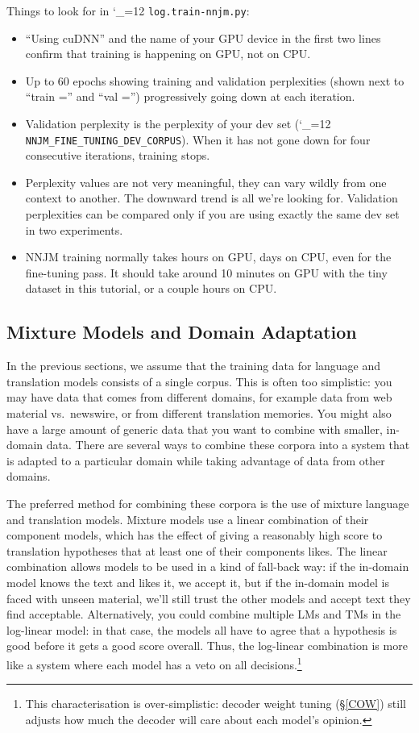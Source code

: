 \documentclass[11pt,letterpaper]{article}
\def\code{\begingroup\catcode`\_=12 \codex}
\newcommand{\codex}[1]{\texttt{#1}\endgroup}
\begin{document}
Things to look for in \code{log.train-nnjm.py}:
\begin{itemize}
   \item ``Using cuDNN'' and the name of your GPU device in the first two lines
      confirm that training is happening on GPU, not on CPU.
   \item Up to 60 epochs showing training and validation perplexities (shown
      next to ``train ='' and ``val ='') progressively going down at each
      iteration.
   \item Validation perplexity is the perplexity of your dev set
      (\code{NNJM_FINE_TUNING_DEV_CORPUS}). When it has not gone down for four
      consecutive iterations, training stops.
   \item Perplexity values are not very meaningful, they can vary wildly from
      one context to another. The downward trend is all we're looking for.
      Validation perplexities can be compared only if you are using exactly the
      same dev set in two experiments.
   \item NNJM training normally takes hours on GPU, days on CPU, even for the
      fine-tuning pass. It should take around 10 minutes on GPU with the tiny
      dataset in this tutorial, or a couple hours on CPU.
\end{itemize}

\subsection{Mixture Models and Domain Adaptation} \label{MIX}

In the previous sections, we assume that the training data for
language and translation models consists of a single corpus.  This is often too
simplistic: you may have data that comes from different domains, for example
data from web material vs.\ newswire, or from different translation memories.
You might also have a large amount of generic data that you want to combine
with smaller, in-domain data.  There are several ways to combine these corpora
into a system that is adapted to a particular domain while taking advantage of
data from other domains.

The preferred method for combining these corpora is the use of mixture language
and translation models.
Mixture models use a linear combination of their component models, which has
the effect of giving a reasonably high score to translation hypotheses that at least
one of their components likes.  The linear combination allows models to
be used in a kind of fall-back way: if the in-domain model knows the text and
likes it, we accept it, but if the in-domain model is faced with unseen
material, we'll still trust the other models and accept text they find
acceptable.  Alternatively, you could combine multiple LMs and TMs in the
log-linear model: in that case, the models all have to agree that a hypothesis
is good before it gets a good score overall.  Thus, the log-linear combination
is more like a system where each model has a veto on all
decisions.\footnote{This characterisation is over-simplistic: decoder weight
tuning (\S\ref{COW}) still adjusts how much the decoder will care about each
model's opinion.}
\end{document}
